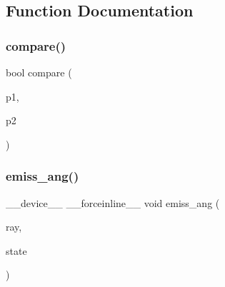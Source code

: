 \subsection{Function Documentation}
\mbox{\label{mc__gpu_8cu_ae7878c7cabc4f92516def54a8b2ae0ab}} 
\subsubsection{\texorpdfstring{compare()}{compare()}}
{\footnotesize\ttfamily bool compare (\begin{DoxyParamCaption}\item[{\hyperlink{structPAIR}{P\+A\+IR}}]{p1,  }\item[{\hyperlink{structPAIR}{P\+A\+IR}}]{p2 }\end{DoxyParamCaption})}

\mbox{\label{mc__gpu_8cu_a371d09f214d1f9af7f47717c97ec18b0}} 
\subsubsection{\texorpdfstring{emiss\+\_\+ang()}{emiss\_ang()}}
{\footnotesize\ttfamily \+\_\+\+\_\+device\+\_\+\+\_\+ \+\_\+\+\_\+forceinline\+\_\+\+\_\+ void emiss\+\_\+ang (\begin{DoxyParamCaption}\item[{\hyperlink{definitions_8h_a784616beaf04e11707aff8fd62ce0b8b}{Beam} $\ast$}]{ray,  }\item[{curand\+State\+\_\+t $\ast$}]{state }\end{DoxyParamCaption})}

\mbox{\label{mc__gpu_8cu_a44d098df49e84e1042008b6299d5a9d1}} 
